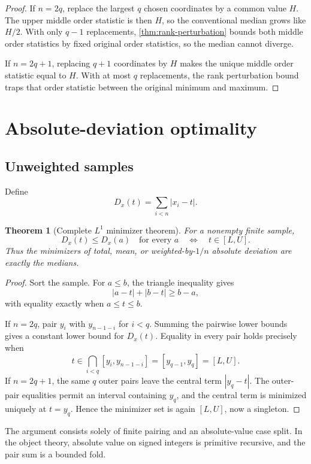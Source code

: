 \documentclass[11pt]{article}
\newtheorem{theorem}{Theorem}[section]
\newcommand{\abs}[1]{\left|#1\right|}
\begin{document}
\begin{proof}
If $n=2q$, replace the largest $q$ chosen coordinates by a common value $H$.
The upper middle order statistic is then $H$, so the conventional median grows
like $H/2$.  With only $q-1$ replacements, \cref{thm:rank-perturbation} bounds
both middle order statistics by fixed original order statistics, so the
median cannot diverge.

If $n=2q+1$, replacing $q+1$ coordinates by $H$ makes the unique middle order
statistic equal to $H$.  With at most $q$ replacements, the rank perturbation
bound traps that order statistic between the original minimum and maximum.
\end{proof}

\section{Absolute-deviation optimality}

\subsection{Unweighted samples}

Define
\[
  D_x(t)=\sum_{i<n}\abs{x_i-t}.
\]

\begin{theorem}[Complete $L^1$ minimizer theorem]\label{thm:l1}
For a nonempty finite sample,
\[
 D_x(t)\leq D_x(a)\quad\text{for every }a
 \quad\Longleftrightarrow\quad t\in[L,U].
\]
Thus the minimizers of total, mean, or weighted-by-$1/n$ absolute deviation are
exactly the medians.
\end{theorem}

\begin{proof}
Sort the sample.  For $a\leq b$, the triangle inequality gives
\[
  \abs{a-t}+\abs{b-t}\geq b-a,
\]
with equality exactly when $a\leq t\leq b$.

If $n=2q$, pair $y_i$ with $y_{n-1-i}$ for $i<q$.  Summing the pairwise lower
bounds gives a constant lower bound for $D_x(t)$.  Equality in every pair
holds precisely when
\[
  t\in\bigcap_{i<q}[y_i,y_{n-1-i}]
   =[y_{q-1},y_q]=[L,U].
\]
If $n=2q+1$, the same $q$ outer pairs leave the central term
$\abs{y_q-t}$.  The outer-pair equalities permit an interval containing
$y_q$, and the central term is minimized uniquely at $t=y_q$.  Hence the
minimizer set is again $[L,U]$, now a singleton.
\end{proof}

The argument consists solely of finite pairing and an absolute-value case
split.  In the object theory, absolute value on signed integers is primitive
recursive, and the pair sum is a bounded fold.
\end{document}
